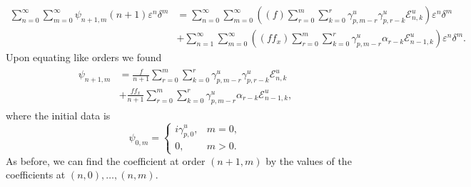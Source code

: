 \begin{align*}\sum_{n=0}^{\infty}\sum_{m=0}^{\infty}\psi_{n+1,m}(n+1)\varepsilon^n\delta^m&=
\sum_{n=0}^{\infty}\sum_{m=0}^{\infty}\left((f)\sum_{r=0}^m \sum_{k=0}^r \gamma^u_{p,m-r}\gamma^u_{p,r-k}\mathcal{E}^u_{n,k}\right)\varepsilon^n\delta^m\\&+
\sum_{n=1}^{\infty}\sum_{m=0}^{\infty}\left(( ff_x)\sum_{r=0}^m \sum_{k=0}^r \gamma^u_{p,m-r}\alpha_{r-k}\mathcal{E}^u_{n-1,k}\right)\varepsilon^n\delta^m
.\end{align*}
Upon equating like orders we found
\begin{align}
\begin{split}
\psi_{n+1,m} &= \frac{f}{n+1}\sum_{r=0}^m \sum_{k=0}^r \gamma^u_{p,m-r}\gamma^u_{p,r-k}\mathcal{E}^u_{n,k} \\&+
\frac{ff_x}{n+1}\sum_{r=0}^m \sum_{k=0}^r \gamma^u_{p,m-r}\alpha_{r-k}\mathcal{E}^u_{n-1,k},
\end{split}
\end{align}
where the initial data is
\begin{equation}\mathcal{\psi}_{0,m}= 
\begin{cases} 
i\gamma^u_{p,0}, & m=0, \\
0, & m>0.
\end{cases}  \end{equation}
As before, we can find the coefficient at order $(n+1,m)$ by the values of the coefficients at $(n,0),\ldots ,(n,m)$.